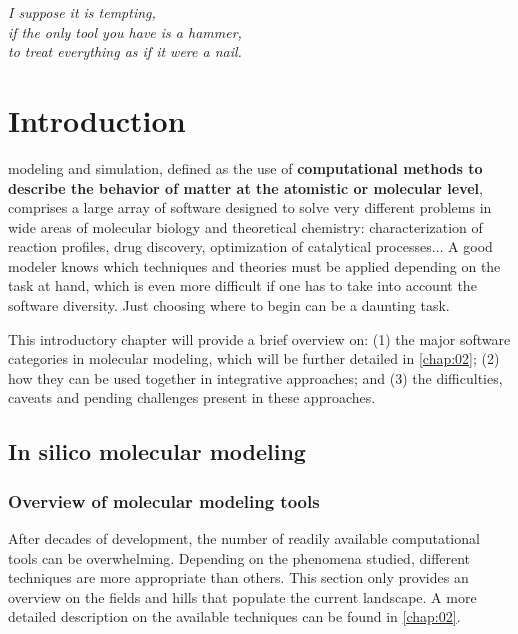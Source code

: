
\begin{savequote}[0.6\textwidth]
	\itshape I suppose it is tempting, \\
	\itshape if the only tool you have is a hammer, \\
	\itshape to treat everything as if it were a nail.
\end{savequote}

\chapter{Introduction}
\label{chap:01}

 modeling and simulation, defined as the use of \textbf{computational methods to describe the behavior of matter at the atomistic or molecular level},\cite{maginn2009} comprises a large array of software designed to solve very different problems in wide areas of molecular biology and theoretical chemistry: characterization of reaction profiles, drug discovery, optimization of catalytical processes$ \ldots $  A good modeler knows which techniques and theories must be applied depending on the task at hand, which is even more difficult if one has to take into account the software diversity. Just choosing where to begin can be a daunting task.

This introductory chapter will provide a brief overview on: (1) the major software categories in molecular modeling, which will be further detailed in \autoref{chap:02}; (2) how they can be used together in integrative approaches; and (3) the difficulties, caveats and pending challenges present in these approaches.

\section{In silico molecular modeling}
\subsection{Overview of molecular modeling tools}

After decades of development, the number of readily available computational tools can be overwhelming. Depending on the phenomena studied, different techniques are more appropriate than others. This section only provides an overview on the fields and hills that populate the current landscape. A more detailed description on the available techniques can be found in \autoref{chap:02}.

